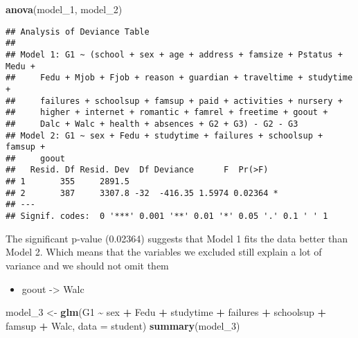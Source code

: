 \documentclass[
]{article}
\newenvironment{Shaded}{\begin{snugshade}}{\end{snugshade}}
\newcommand{\AttributeTok}[1]{\textcolor[rgb]{0.13,0.29,0.53}{#1}}
\newcommand{\FunctionTok}[1]{\textcolor[rgb]{0.13,0.29,0.53}{\textbf{#1}}}
\newcommand{\NormalTok}[1]{#1}
\newcommand{\OtherTok}[1]{\textcolor[rgb]{0.56,0.35,0.01}{#1}}
\newcommand{\SpecialCharTok}[1]{\textcolor[rgb]{0.81,0.36,0.00}{\textbf{#1}}}
\providecommand{\tightlist}{%
  \setlength{\itemsep}{0pt}\setlength{\parskip}{0pt}}
\begin{document}
\begin{Shaded}
\begin{Highlighting}[]
\FunctionTok{anova}\NormalTok{(model\_1, model\_2)}
\end{Highlighting}
\end{Shaded}

\begin{verbatim}
## Analysis of Deviance Table
## 
## Model 1: G1 ~ (school + sex + age + address + famsize + Pstatus + Medu + 
##     Fedu + Mjob + Fjob + reason + guardian + traveltime + studytime + 
##     failures + schoolsup + famsup + paid + activities + nursery + 
##     higher + internet + romantic + famrel + freetime + goout + 
##     Dalc + Walc + health + absences + G2 + G3) - G2 - G3
## Model 2: G1 ~ sex + Fedu + studytime + failures + schoolsup + famsup + 
##     goout
##   Resid. Df Resid. Dev  Df Deviance      F  Pr(>F)  
## 1       355     2891.5                              
## 2       387     3307.8 -32  -416.35 1.5974 0.02364 *
## ---
## Signif. codes:  0 '***' 0.001 '**' 0.01 '*' 0.05 '.' 0.1 ' ' 1
\end{verbatim}

The significant p-value (0.02364) suggests that Model 1 fits the data
better than Model 2. Which means that the variables we excluded still
explain a lot of variance and we should not omit them

\begin{itemize}
\tightlist
\item
  goout -\textgreater{} Walc
\end{itemize}

\begin{Shaded}
\begin{Highlighting}[]
\NormalTok{model\_3 }\OtherTok{\textless{}{-}} \FunctionTok{glm}\NormalTok{(G1 }\SpecialCharTok{\textasciitilde{}}\NormalTok{ sex }\SpecialCharTok{+}\NormalTok{ Fedu }\SpecialCharTok{+}\NormalTok{ studytime }\SpecialCharTok{+}\NormalTok{ failures }\SpecialCharTok{+}\NormalTok{ schoolsup }\SpecialCharTok{+}\NormalTok{ famsup }\SpecialCharTok{+}\NormalTok{ Walc, }\AttributeTok{data =}\NormalTok{ student)}
\FunctionTok{summary}\NormalTok{(model\_3)}
\end{Highlighting}
\end{Shaded}
\end{document}
